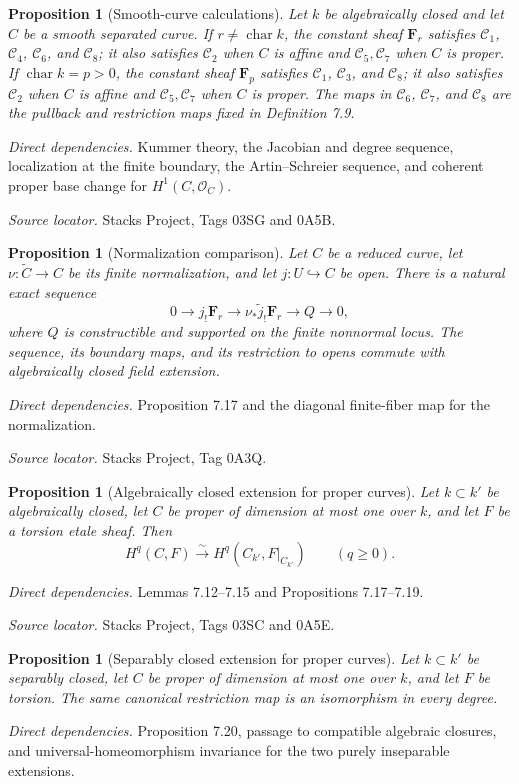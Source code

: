 \documentclass[10pt]{article}
\newtheorem{proposition}[theorem]{Proposition}
\theoremstyle{definition}
\newcommand{\F}{\mathbf F}
\newcommand{\deps}[1]{\par\smallskip\textit{Direct dependencies.} #1\par}
\newcommand{\sources}[1]{\par\textit{Source locator.} #1\par}
\begin{document}
\begin{proposition}[Smooth-curve calculations]
Let $k$ be algebraically closed and let $C$ be a smooth separated curve.
If $r\neq\operatorname{char}k$, the constant sheaf $\F_r$ satisfies
$\mathcal C_1$, $\mathcal C_4$, $\mathcal C_6$, and $\mathcal C_8$; it
also satisfies $\mathcal C_2$ when $C$ is affine and
$\mathcal C_5,\mathcal C_7$ when $C$ is proper.  If
$\operatorname{char}k=p>0$, the constant sheaf $\F_p$ satisfies
$\mathcal C_1$, $\mathcal C_3$, and $\mathcal C_8$; it also satisfies
$\mathcal C_2$ when $C$ is affine and $\mathcal C_5,\mathcal C_7$ when
$C$ is proper.  The maps in $\mathcal C_6$, $\mathcal C_7$, and
$\mathcal C_8$ are the pullback and restriction maps fixed in Definition
7.9.
\end{proposition}
\deps{Kummer theory, the Jacobian and degree sequence, localization at the
finite boundary, the Artin--Schreier sequence, and coherent proper base
change for $H^1(C,\mathcal O_C)$.}
\sources{Stacks Project, Tags 03SG and 0A5B.}

\begin{proposition}[Normalization comparison]
Let $C$ be a reduced curve, let $\nu:\widetilde C\to C$ be its finite
normalization, and let $j:U\hookrightarrow C$ be open.  There is a natural
exact sequence
\[
 0\to j_!\F_r\longrightarrow
 \nu_*\widetilde j_!\F_r\longrightarrow Q\to0,
\]
where $Q$ is constructible and supported on the finite nonnormal locus.
The sequence, its boundary maps, and its restriction to opens commute with
algebraically closed field extension.
\end{proposition}
\deps{Proposition 7.17 and the diagonal finite-fiber map for the
normalization.}
\sources{Stacks Project, Tag 0A3Q.}

\begin{proposition}[Algebraically closed extension for proper curves]
Let $k\subset k'$ be algebraically closed, let $C$ be proper of dimension
at most one over $k$, and let $F$ be a torsion etale sheaf.  Then
\[
 H^q(C,F)\xrightarrow{\sim}H^q(C_{k'},F|_{C_{k'}})
 \qquad(q\geq0).
\]
\end{proposition}
\deps{Lemmas 7.12--7.15 and Propositions 7.17--7.19.}
\sources{Stacks Project, Tags 03SC and 0A5E.}

\begin{proposition}[Separably closed extension for proper curves]
Let $k\subset k'$ be separably closed, let $C$ be proper of dimension at
most one over $k$, and let $F$ be torsion.  The same canonical restriction
map is an isomorphism in every degree.
\end{proposition}
\deps{Proposition 7.20, passage to compatible algebraic closures, and
universal-homeomorphism invariance for the two purely inseparable
extensions.}
\end{document}
